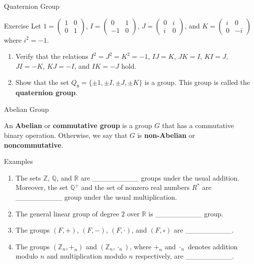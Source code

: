 \documentclass{beamer}
\begin{document}
\begin{frame}{Quaternion Group}
\begin{block}{Exercise}
\justifying
Let $1 = \begin{pmatrix} 1 & 0 \\ 0 & 1 \end{pmatrix}$, $I = \begin{pmatrix} 0 & 1 \\ -1 & 0 \end{pmatrix}$, $J = \begin{pmatrix} 0 & i \\ i & 0 \end{pmatrix}$, and $K = \begin{pmatrix} i & 0 \\ 0 & -i \end{pmatrix}$ where $i^2 = -1$.
\begin{enumerate}
\justifying
\item Verify that the relations $I^2 = J^2 = K^2 = -1$, $IJ = K$, $JK = I$, $KI = J$, $JI = -K$, $KJ = -I$, and $IK = -J$ hold.
\item Show that the set $Q_8 = \{\pm 1, \pm I, \pm J, \pm K\}$ is a group. This group is called the \textbf{quaternion group}.
\end{enumerate}
\end{block}
\end{frame}

\begin{frame}{Abelian Group}
\begin{definition}
\justifying
An \textbf{Abelian} or \textbf{commutative group} is a group $G$ that has a commutative binary operation. Otherwise, we say that $G$ is \textbf{non-Abelian} or \textbf{noncommutative}.
\end{definition}
\end{frame}

\begin{frame}{Examples}
\begin{enumerate}
\justifying
\item The sets $\mathbb{Z}$, $\mathbb{Q}$, and $\mathbb{R}$ are \_\_\_\_\_\_\_\_\_ groups under the usual addition. Moreover, the set $\mathbb{Q}^+$ and the set of nonzero real numbers $R^{*}$ are \_\_\_\_\_\_\_\_\_ group under the usual multiplication.
\item The general linear group of degree $2$ over $\mathbb{R}$ is \_\_\_\_\_\_\_\_\_ group.
\item The groups $(F, +)$, $(F, -)$, $(F, \cdot)$, and $(F, \circ)$ are \_\_\_\_\_\_\_\_\_.  
\item The groups $\left(\mathbb{Z}_n, +_n\right)$ and $\left(\mathbb{Z}_n, \cdot_n\right)$, where $+_n$ and $\cdot_n$ denotes addition modulo $n$ and multiplication modulo $n$ respectively, are \_\_\_\_\_\_\_\_\_.
\end{enumerate}    
\end{frame}
\end{document}
